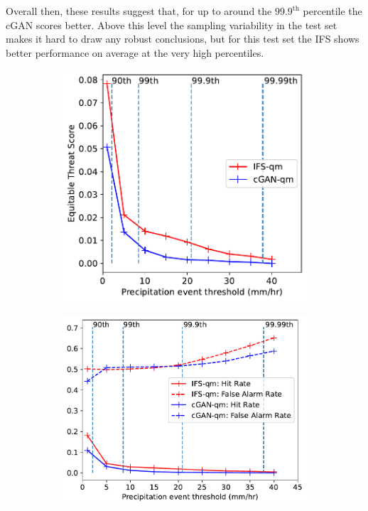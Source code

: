\documentclass[../main.tex]{subfiles}
\begin{document}
Overall then, these results suggest that, for up to around the $99.9^{\text{th}}$ percentile the cGAN scores better. Above this level the sampling variability in the test set makes it hard to draw any robust conclusions, but for this test set the IFS shows better performance on average at the very high percentiles.



\begin{figure}[ht]
    \centering
     \begin{subfigure}[t]{0.45\textwidth}

     \includegraphics[width=\textwidth]{images/ets_final-nologs_217600.pdf}
     \caption{}
     \end{subfigure}
     \hfill
     \centering
     \begin{subfigure}[t]{0.49\textwidth}
     \includegraphics[width=\textwidth]{images/hit_rate_final-nologs_217600.pdf}

\end{subfigure}
\end{figure}
\end{document}
